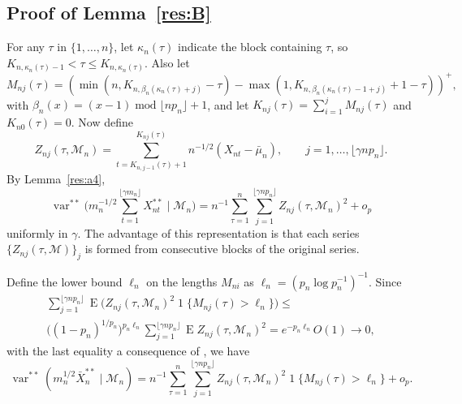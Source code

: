 \documentclass[12pt]{article}
\theoremstyle{definition}
\DeclareMathOperator{\E}{E}
\DeclareMathOperator{\ind}{1}
\DeclareMathOperator{\var}{var}
\renewcommand{\mod}{\operatorname{mod}}
\begin{document}
\subsection*{Proof of Lemma~\ref{res:B}}
For any $\tau$ in $\{1,\dots,n\}$, let $\kappa_n(\tau)$ indicate the
block containing $\tau$, so $K_{n,\kappa_n(\tau)-1} < \tau \leq
K_{n,\kappa_n(\tau)}$.  Also let
\begin{equation}
  M_{nj}(\tau) = (\min(n, K_{n,\beta_n(\kappa_n(\tau) + j)} - \tau) - \max(1,
  K_{n,\beta_n(\kappa_n(\tau) - 1 + j)} + 1 - \tau))^{+},
\end{equation}
with $\beta_n(x) = (x-1) \mod \lfloor n p_n \rfloor + 1$, and let
$K_{nj}(\tau) = \sum_{i=1}^j M_{nj}(\tau)$ and $K_{n0}(\tau) = 0$.
Now define
\begin{equation}
  Z_{nj}(\tau,\mathcal{M}_n) = \sum_{t=K_{n,j-1}(\tau)+1}^{K_{nj}(\tau)} n^{-1/2} (X_{nt} - \bar \mu_n), \qquad j = 1,\dots,
  \lfloor \gamma n p_n \rfloor.
\end{equation}
By Lemma~\ref{res:a4},
\begin{equation}
  \var^{**}\Big(m_n^{-1/2} \sum_{t=1}^{\lfloor \gamma m_n\rfloor} X_{nt}^{**} \mid \mathcal{M}_n\Big) = n^{-1}
  \sum_{\tau = 1}^n \sum_{j=1}^{\lfloor \gamma n p_n \rfloor} Z_{nj}(\tau,
  \mathcal{M}_n)^2 + o_p
\end{equation}
uniformly in $\gamma$.  The advantage of this representation is that
each series $\{Z_{nj}(\tau, \mathcal{M})\}_j$ is formed from
consecutive blocks of the original series.

Define the lower bound $\ell_n$ on the lengths $M_{ni}$ as $\ell_n =
(p_n \log p_n^{-1})^{-1}$.  Since
\begin{multline}
  \sum_{j=1}^{\lfloor \gamma n p_n \rfloor} \E\big( Z_{nj}(\tau,
  \mathcal{M}_n)^2 \ind\{M_{nj}(\tau) > \ell_n\}\big) \leq \\ \big((1
  - p_n)^{1/p_n}\big)^{p_n\ell_n} \sum_{j=1}^{\lfloor \gamma n p_n
    \rfloor} \E Z_{nj}(\tau, \mathcal{M}_n)^2 = e^{-p_n\ell_n} O(1)
  \to 0,
\end{multline}
with the last equality a consequence of \citet[Theorem~1.6]{Mcl:75},
we have
\begin{equation}
  \var^{**}(m_n^{1/2} \bar{X}^{**}_n \mid \mathcal{M}_n) = n^{-1} \sum_{\tau=1}^n
  \sum_{j=1}^{\lfloor \gamma n p_n \rfloor} Z_{nj}(\tau, \mathcal{M}_n)^2
  \ind\{M_{nj}(\tau) > \ell_n\} + o_p.
\end{equation}
\end{document}
